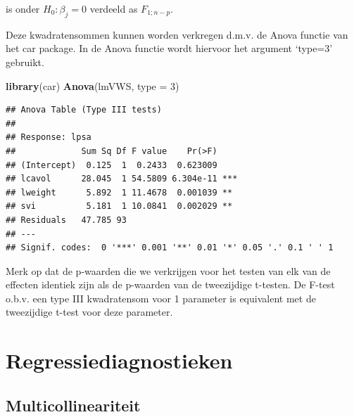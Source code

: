 \documentclass[
  12pt,dutch]{book}
\newenvironment{Shaded}{\begin{snugshade}}{\end{snugshade}}
\newcommand{\AttributeTok}[1]{\textcolor[rgb]{0.13,0.29,0.53}{#1}}
\newcommand{\DecValTok}[1]{\textcolor[rgb]{0.00,0.00,0.81}{#1}}
\newcommand{\FunctionTok}[1]{\textcolor[rgb]{0.13,0.29,0.53}{\textbf{#1}}}
\newcommand{\NormalTok}[1]{#1}
\theoremstyle{definition}
\theoremstyle{definition}
\theoremstyle{definition}
\theoremstyle{definition}
\theoremstyle{remark}
\begin{document}
is onder \(H_0:\beta_j=0\) verdeeld as \(F_{1;n-p}\).

Deze kwadratensommen kunnen worden verkregen d.m.v. de Anova functie van het car package. In de Anova functie wordt hiervoor het argument `type=3' gebruikt.

\begin{Shaded}
\begin{Highlighting}[]
\FunctionTok{library}\NormalTok{(car)}
\FunctionTok{Anova}\NormalTok{(lmVWS, }\AttributeTok{type =} \DecValTok{3}\NormalTok{)}
\end{Highlighting}
\end{Shaded}

\begin{verbatim}
## Anova Table (Type III tests)
## 
## Response: lpsa
##             Sum Sq Df F value    Pr(>F)    
## (Intercept)  0.125  1  0.2433  0.623009    
## lcavol      28.045  1 54.5809 6.304e-11 ***
## lweight      5.892  1 11.4678  0.001039 ** 
## svi          5.181  1 10.0841  0.002029 ** 
## Residuals   47.785 93                      
## ---
## Signif. codes:  0 '***' 0.001 '**' 0.01 '*' 0.05 '.' 0.1 ' ' 1
\end{verbatim}

Merk op dat de p-waarden die we verkrijgen voor het testen van elk van de effecten identiek zijn als de p-waarden van de tweezijdige t-testen.
De F-test o.b.v. een type III kwadratensom voor 1 parameter is equivalent met de tweezijdige t-test voor deze parameter.

\section{Regressiediagnostieken}\label{regressiediagnostieken}

\subsection{Multicollineariteit}\label{multicollineariteit}
\end{document}
